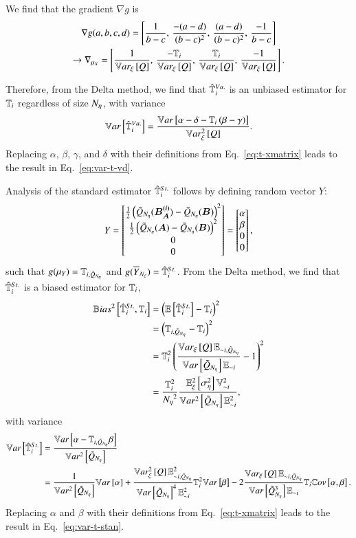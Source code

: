 We find that the gradient $\nabla g$ is
\begin{gather}
    \nabla g (a,b,c,d) = \left[ \frac{1}{b-c}, \, \frac{-(a-d)}{(b-c)^2}, \, \frac{(a-d)}{(b-c)^2}, \, \frac{-1}{b-c} \right] \\
    \rightarrow \nabla_{\mu_X} = \left[ \frac{1}{\Vxi{Q}} ,\, \frac{- \T{i}}{\Vxi{Q}} ,\, \frac{\T{i}}{\Vxi{Q}} ,\, \frac{-1}{\Vxi{Q}} \right] .
\end{gather}

Therefore, from the Delta method, we find that $\unpollTsalt{i}$ is an unbiased estimator for $\T{i}$ regardless of size $\Neta$, with variance
\begin{equation}
    \Var{\unpollTsalt{i}} = \frac{\Var{\alpha - \delta - \T{i} \left( \beta - \gamma \right)}}{\Vxisq{Q}} .
\end{equation}
Replacing $\alpha$, $\beta$, $\gamma$, and $\delta$ with their definitions from Eq.~\eqref{eq:t-xmatrix} leads to the result in Eq.~\ref{eq:var-t-vd}.

Analysis of the standard estimator $\pollTsalt{i}$ follows by defining random vector $Y$:
\begin{equation*}
        Y = \begin{bmatrix} \frac{1}{2} \left( \Qpoll(\bm{B_A^{(i)}}) - \Qpoll(\bm{B}) \right)^2 \\
                        \frac{1}{2} \left( \Qpoll(\bm{A}) - \Qpoll(\bm{B}) \right)^2 \\
                        0 \\
                        0
        \end{bmatrix}
        = \begin{bmatrix} \alpha \\ \beta \\ 0 \\ 0 \end{bmatrix},
\end{equation*}
such that $g(\mu_Y) = \Tpoll{i}$ and $g(\yavg) = \pollTsalt{i}$. 
From the Delta method, we find that $\pollTsalt{i}$ is a biased estimator for $\T{i}$, 
\begin{align}
    \bias{\pollTsalt{i}, \T{i}} &= \left( \EE{\pollTsalt{i}} - \T{i} \right)^2 \\
    &= \left( \Tpoll{i} - \T{i} \right)^2 \\
    &= \T{i}^2 \left( \frac{\Vxi{Q}\pollE{\ni}}{\Var{\Qpoll}\E{\ni}} - 1 \right)^2 \\
    &= \frac{\T{i}^2}{\Neta^2} \frac{\EExisq{\Sigsqeta} \V{\ni}^2}{\Vsq{\Qpoll} \E{\ni}^2} ,
\end{align}
with variance
\begin{align}
        \Var{\pollTsalt{i}} &= \frac{\Var{\alpha - \Tpoll{i}\beta}}{\Vsq{\Qpoll}} \\
        &= \frac{1}{\Vsq{\Qpoll}}\Var{\alpha} + \frac{\Vxisq{Q} \pollE{\ni}^2 }{\Var{\Qpoll}^4 \E{\ni}^2}\T{i}^2 \Var{\beta} - 2 \frac{\Vxi{Q} \pollE{\ni}}{\Var{\Qpoll^3}\E{\ni}} \T{i} \Cov{\alpha}{\beta} .
\end{align}
Replacing $\alpha$ and $\beta$ with their definitions from Eq.~\eqref{eq:t-xmatrix} leads to the result in Eq.~\ref{eq:var-t-stan}.


